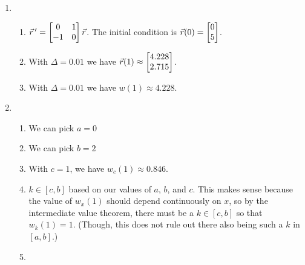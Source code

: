 

\begin{enumerate}
	\item \begin{enumerate}
		      \item $\vec r\,' = \begin{bmatrix}0&1\\-1&0\end{bmatrix}\vec r$. The initial condition is $\vec r(0) = \begin{bmatrix}0\\5\end{bmatrix}$.
		      \item With $\Delta=0.01$ we have $\vec r(1)\approx\begin{bmatrix}4.228\\2.715\end{bmatrix}$.
		      \item With $\Delta=0.01$ we have $w(1)\approx4.228$.
	      \end{enumerate}
	\item \begin{enumerate}
		      \item We can pick $a=0$
		      \item We can pick $b=2$
		      \item With $c=1$, we have $w_c(1)\approx 0.846$.
		      \item $k\in [c,b]$ based on our values of $a$, $b$, and $c$. This makes sense because
		            the value of $w_x(1)$ should depend continuously on $x$, so by the intermediate value theorem,
		            there must be a $k\in [c,b]$ so that $w_k(1)=1$. (Though, this does not rule out there also
		            being such a $k$ in $[a,b]$.)
		      \item \phantom{x}


\end{enumerate}
\end{enumerate}
